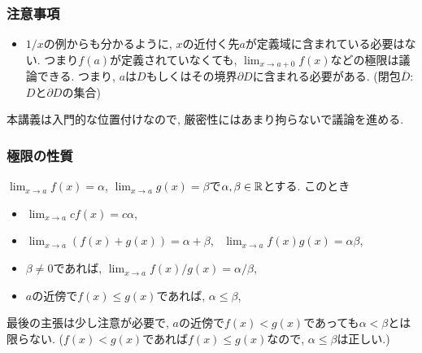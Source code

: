 

\begin{frame}
\frametitle{注意事項} 


\begin{Rem}
\begin{itemize}
\item $1/x$の例からも分かるように, $x$の近付く先$a$が定義域に含まれている必要はない. 
つまり$f(a)$が定義されていなくても, $\displaystyle \lim_{x \to a+0}f(x)$などの極限は議論できる. 
つまり, $a$は$D$もしくはその境界$\partial D$に含まれる必要がある. (閉包$\overline{D}$: $D$と$\partial D$の集合)
\end{itemize}
\end{Rem}

本講義は入門的な位置付けなので, 厳密性にはあまり拘らないで議論を進める. 

\end{frame}





\begin{frame}
\frametitle{極限の性質} 


\begin{Thm}
$\displaystyle \lim_{x\to a}f(x)=\alpha$, $\displaystyle \lim_{x\to a}g(x)=\beta$で$\alpha,\beta \in \mathbb{R}$とする. 
このとき
\begin{itemize}
\item $\displaystyle \lim_{x\to a} cf(x)=c \alpha$, \vspace{1mm}
\item $\displaystyle \lim_{x\to a}(f(x)+g(x))=\alpha+\beta$, \ $\displaystyle \lim_{x\to a}f(x)g(x)=\alpha\beta$,  \vspace{1mm}
\item $\beta \neq0$であれば, $\displaystyle \lim_{x\to a}f(x)/g(x)=\alpha/\beta$,  \vspace{1mm}
\item $a$の近傍で$f(x)\le g(x)$であれば, $\alpha \le \beta$, 
\end{itemize}
\end{Thm}

最後の主張は少し注意が必要で, $a$の近傍で$f(x)< g(x)$であっても$\alpha < \beta$とは限らない.  
($f(x)< g(x)$であれば$f(x)\le g(x)$なので, $\alpha \le \beta$は正しい.)

\end{frame}


